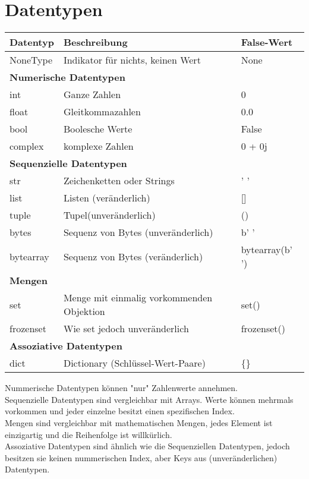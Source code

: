 \section{Datentypen}
\begin{tabular}{ lll }
	\hline
	\textbf{Datentyp} & \textbf{Beschreibung} & \textbf{False-Wert}\\
	\hline
	NoneType & Indikator für nichts, keinen Wert & None \\
	\hline
	\multicolumn{3}{l}{\textbf{Numerische Datentypen}}\\
	int&Ganze Zahlen & 0\\
	float&Gleitkommazahlen&0.0\\
	bool&Boolesche Werte&False\\
	complex&komplexe Zahlen& 0 + 0j\\
	\hline
	\multicolumn{3}{l}{\textbf{Sequenzielle Datentypen}}\\
	str&Zeichenketten oder Strings&' '\\
	list&Listen (veränderlich)&[]\\
	tuple&Tupel(unveränderlich)&()\\
	bytes&Sequenz von Bytes (unveränderlich)&b' '\\
	bytearray&Sequenz von Bytes (veränderlich)&bytearray(b' ')\\
   \hline
   \multicolumn{3}{l}{\textbf{Mengen}}\\
   set&Menge mit einmalig vorkommenden Objektion&set()\\
   frozenset& Wie set jedoch unveränderlich&frozenset()\\
   \hline
   \multicolumn{3}{l}{\textbf{Assoziative Datentypen}}\\
   dict&Dictionary (Schlüssel-Wert-Paare)&\{\}\\
   \hline
\end{tabular}

Nummerische Datentypen können "nur" Zahlenwerte annehmen.\\
Sequenzielle Datentypen sind vergleichbar mit Arrays. Werte können mehrmals vorkommen
und jeder einzelne besitzt einen spezifischen Index.\\
Mengen sind vergleichbar mit mathematischen Mengen, jedes Element ist einzigartig
und die Reihenfolge ist willkürlich.\\
Assoziative Datentypen sind ähnlich wie die Sequenziellen Datentypen, jedoch besitzen sie 
keinen nummerischen Index, aber Keys aus (unveränderlichen) Datentypen.